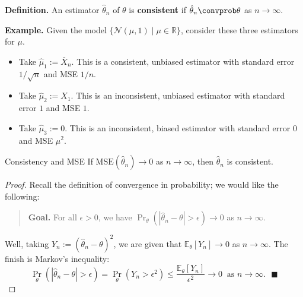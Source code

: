 \textbf{Definition.} An estimator $\hat{\theta}_n$ of $\theta$
is \textbf{consistent} if $\hat{\theta}_n \convprob \theta$ as $n \to \infty$.

\textbf{Example.} Given the model $\{\mathcal{N}(\mu, 1) \mid \mu \in \mathbb{R}\}$,
consider these three estimators for $\mu$.
\begin{itemize}
    \item Take $\hat{\mu}_1 := \bar{X}_n$.  This is a consistent, unbiased estimator
    with standard error $1/\sqrt{n}$ and MSE $1/n$.
    \item Take $\hat{\mu}_2 := X_1$.  This is an inconsistent, unbiased estimator
    with standard error $1$ and MSE $1$.
    \item Take $\hat{\mu}_3 := 0$.  This is an inconsistent, biased estimator
    with standard error $0$ and MSE $\mu^2$.
\end{itemize}

\begin{theorem}{Consistency and MSE}
    If $\mathrm{MSE}(\hat{\theta}_n) \to 0$ as $n \to \infty$,
    then $\hat{\theta}_n$ is consistent.
\end{theorem}

\begin{proof}
    Recall the definition of convergence in probability; we would like the following:
    \begin{quote}
        \textbf{Goal.} For all $\epsilon > 0$,
        we have $\Pr_{\theta}(|\hat{\theta}_n - \theta| > \epsilon) \to 0$
        as $n \to \infty$. 
    \end{quote}
    Well, taking $Y_n := (\hat{\theta}_n - \theta)^2$, we are given that
    $\mathbb{E}_{\theta}[Y_n] \to 0$ as $n \to \infty$.  The finish is Markov's inequality:
    \[ \Pr_{\theta}(|\hat{\theta}_n - \theta| > \epsilon)
    = \Pr_{\theta}(Y_n > \epsilon^2) \leq \frac{\mathbb{E}_{\theta}[Y_n]}{\epsilon^2}
    \to 0 ~ \text{ as } n \to \infty. ~~~ \blacksquare \]
\end{proof}

